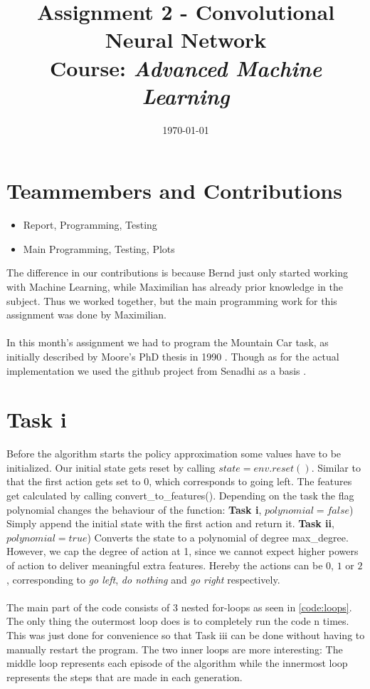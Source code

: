 \documentclass{article}
\title{Assignment 2 - Convolutional Neural Network\\
		{\large Course: \textit{Advanced Machine Learning}}}
\date{\today}
\begin{document}
	
	\maketitle
	
	\section{Teammembers and Contributions}
	\label{sec:TeammembersAndContributions}
	
	\begin{itemize}
		\item {} Report, Programming, Testing
		\item {} Main Programming, Testing, Plots
	\end{itemize}
	
	\noindent The difference in our contributions is because Bernd just only started working with Machine Learning, while Maximilian has already prior knowledge in the subject. Thus we worked together, but the main programming work for this assignment was done by Maximilian. \\
	\\
	In this month's assignment we had to program the Mountain Car task, as initially described by Moore's PhD thesis in 1990 \cite{Moore90efficientmemory-based}. Though as for the actual implementation we used the github project from Senadhi as a basis \cite{MountainCar-v02018}. 
	
	
	\section{Task i}
	\label{sec:Taski}
	Before the algorithm starts the policy approximation some values have to be initialized. Our initial state gets reset by calling $state = env.reset()$. Similar to that the first action gets set to $0$, which corresponds to going left. The features get calculated by calling convert\_to\_features(). Depending on the task the flag polynomial changes the behaviour of the function: \textbf{Task i}, $polynomial = false$) Simply append the initial state with the first action and return it. \textbf{Task ii}, $polynomial = true$) Converts the state to a polynomial of degree max\_degree. However, we cap the degree of action at 1, since we cannot expect higher powers of action to deliver meaningful extra features. Hereby the actions can be $0$, $1$ or $2$, corresponding to \textit{go left}, \textit{do nothing} and \textit{go right} respectively.\\
	\\
	The main part of the code consists of 3 nested for-loops as seen in \autoref{code:loops}. The only thing the outermost loop does is to completely run the code n times. This was just done for convenience so that Task iii can be done without having to manually restart the program. The two inner loops are more interesting: The middle loop represents each episode of the algorithm while the innermost loop represents the steps that are made in each generation. 
	
\end{document}
